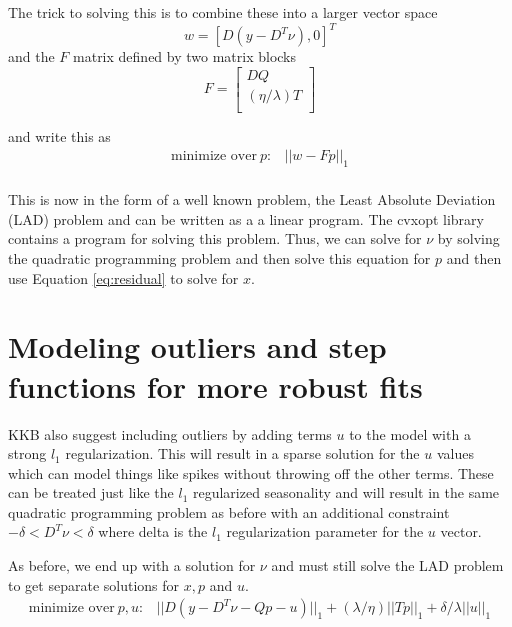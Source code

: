 \documentclass{article}
\begin{document}
The trick to solving this is to combine these into a larger vector space
\[
w = [D (y - D^T \nu), 0]^T
\]
and the $F$ matrix defined by two matrix blocks
\begin{equation}
F=\left[
\begin{array}{c}
D Q  \\
\hline
(\eta/\lambda) T \\
\end{array}\right]
\end{equation}

and write this as
\begin{eqnarray}
\mbox{minimize over}~ p : & ||w-F p||_1 \\
\end{eqnarray}

This is now in the form of a well known problem, the Least Absolute Deviation (LAD) problem and can be written as a
a linear program. The cvxopt library contains a program for solving this problem. Thus,
we can solve for $\nu$ by solving the quadratic programming problem and then solve this equation for $p$ and then
use Equation \ref{eq:residual} to solve for $x$.

\section{Modeling outliers and step functions for more robust fits}
KKB also suggest including outliers by adding terms $u$ to the model with a strong $l_1$ regularization. This will
result in a sparse solution for the $u$ values which can model things like spikes without throwing off the other terms.
These can be treated just like the $l_1$ regularized seasonality and will result in the same quadratic programming
problem as before with an additional constraint $-\delta < D^T \nu < \delta$ where delta is the $l_1$
regularization parameter for the $u$ vector.

As before, we end up with a solution for $\nu$ and must still solve the LAD problem to get separate solutions for
$x, p$ and $u$.
\begin{eqnarray}
\mbox{minimize over} ~p,u : & ||D (y - D^T \nu - Q p - u)||_1 + (\lambda / \eta) ||T p||_1 + \delta/\lambda ||u||_1 \\
\end{eqnarray}
\end{document}
